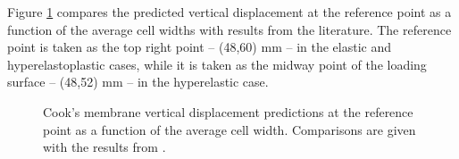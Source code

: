 \documentclass[sn-mathphys,Numbered]{sn-jnl}%
\begin{document}
Figure \ref{fig:cooksMembrane_disp} compares the predicted vertical displacement at the reference point as a function of the average cell widths with results from the literature.
The reference point is taken as the top right point -- (48,60) mm -- in the elastic and hyperelastoplastic cases, while it is taken as the midway point of the loading surface -- (48,52) mm -- in the hyperelastic case.
\begin{figure}[htbp]
   \centering
   \caption{Cook's membrane vertical displacement predictions at the reference point as a function of the average cell width. Comparisons are given with the results from \cite{Zienkiewicz2000, Pelteret2018, Simo1992, Simplas}.}
   \label{fig:cooksMembrane_disp}
\end{figure}
\end{document}
